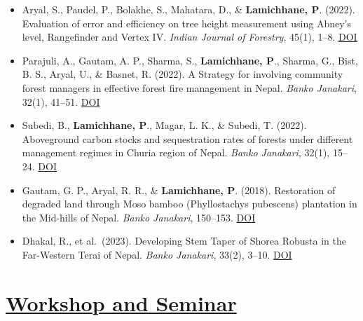 \documentclass[
]{article}
\begin{document}
\begin{itemize}
\item
  Aryal, S., Paudel, P., Bolakhe, S., Mahatara, D., \&
  \textbf{Lamichhane, P}. (2022). Evaluation of error and efficiency on
  tree height measurement using Abney's level, Rangefinder and Vertex
  IV. \emph{Indian Journal of Forestry}, 45(1), 1--8.
  \href{https://doi.org/10.54207/bsmps1000-2022-49P4F8}{DOI}
\item
  Parajuli, A., Gautam, A. P., Sharma, S., \textbf{Lamichhane, P}.,
  Sharma, G., Bist, B. S., Aryal, U., \& Basnet, R. (2022). A Strategy
  for involving community forest managers in effective forest fire
  management in Nepal. \emph{Banko Janakari}, 32(1), 41--51.
  \href{https://doi.org/10.3126/banko.v32i1.45476}{DOI}
\item
  Subedi, B., \textbf{Lamichhane, P}., Magar, L. K., \& Subedi, T.
  (2022). Aboveground carbon stocks and sequestration rates of forests
  under different management regimes in Churia region of Nepal.
  \emph{Banko Janakari}, 32(1), 15--24.
  \href{https://doi.org/10.3126/banko.v32i1.45442}{DOI}
\item
  Gautam, G. P., Aryal, R. R., \& \textbf{Lamichhane, P}. (2018).
  Restoration of degraded land through Moso bamboo (Phyllostachys
  pubescens) plantation in the Mid-hills of Nepal. \emph{Banko
  Janakari}, 150--153.
  \href{https://doi.org/10.3126/banko.v27i3.20560}{DOI}
\item
  Dhakal, R., et al.~(2023). Developing Stem Taper of Shorea Robusta in
  the Far-Western Terai of Nepal. \emph{Banko Janakari}, 33(2), 3--10.
  \href{https://doi.org/10.3126/banko.v33i2.58809}{DOI}
\end{itemize}

\section{\texorpdfstring{\underline{Workshop and Seminar}}{}}\label{section-4}
\end{document}
